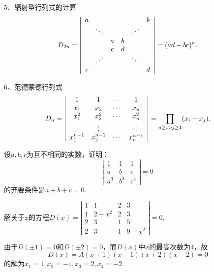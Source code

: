 \begin{frame}
  5、辐射型行列式的计算
  $$
  D_{2n} = \left|
    \begin{array}{cccccc}
      a &     & & & & b \\
        & \ddots & & & \iddots & \\
        &   & a & b &  & \\
        &   & c & d &  &  \\
        & \iddots & & & \ddots & \\
      c &     & & & & d
    \end{array}
  \right|=(ad-bc)^n.
  $$

\end{frame}

\begin{frame}
  6、范德蒙德行列式
  $$
  D_n = \left|
    \begin{array}{cccc}
      1        &  1        & \cdots &    1     \\                    
      x_1      &  x_2      & \cdots &    x_n    \\ 
      x_1^2    &  x_2^2     & \cdots &   x_n^2   \\ 
      \vdots      &  \vdots      &     &    \vdots      \\
      x_1^{n-1} & x_2^{n-1} &  \cdots &  x_n^{n-1}
    \end{array}
  \right|
  = \prod_{n \ge i > j \ge 1}(x_i-x_j).
  $$
\end{frame}

\begin{frame}
  \begin{li}
    设$a,b,c$为互不相同的实数，证明：
    $$
    \left|
      \begin{array}{ccc}
        1   &   1   &   1\\
        a   &   b   &   c\\
        a^3 &   b^3 &   c^3
      \end{array}
    \right|=0
    $$
    的充要条件是$a+b+c=0$.
  \end{li}
\end{frame}


\begin{frame}
  \begin{li}[$\bigstar$]
    解关于$x$的方程$D(x)=
    \left|
      \begin{array}{cccc}
        1&1&2&3\\
        1&2-x^2&2&3\\
        2&3&1&5\\
        2&3&1&9-x^2
      \end{array}
    \right|=0.
    $
  \end{li}
  \pause
  \begin{jie}
    由于$D(\pm1)=0$和$D(\pm2)=0$，而$D(x)$中$x$的最高次数为$4$，故
    $$
    D(x)=A(x+1)(x-1)(x+2)(x-2)=0
    $$
    的解为$x_1=1,x_2=-1,x_3=2,x_4=-2$.
  \end{jie}
\end{frame}
